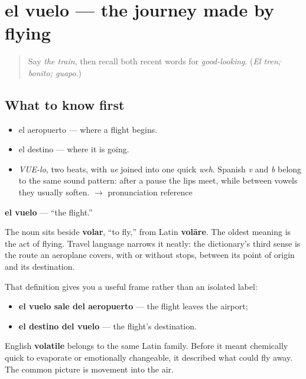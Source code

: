 \section[el vuelo]{el vuelo — the journey made by flying}

\label{lesson:ES-C400-vuelo}



\begin{quote}
Say \emph{the train}, then recall both recent words for \emph{good-looking}. (\emph{El tren; bonito; guapo}.)
\end{quote}

\subsection*{What to know first}
\begin{itemize}
\raggedright
  \item el aeropuerto — where a flight begins.
  \item el destino — where it is going.
\end{itemize}

\begin{sounds}
\begin{itemize}
\raggedright
  \item \emph{VUE-lo}, two beats, with \emph{ue} joined into one quick \emph{weh}. Spanish \emph{v} and \emph{b} belong to the same sound pattern: after a pause the lips meet, while between vowels they usually soften. $\to$ pronunciation reference
\end{itemize}
\end{sounds}

\begin{cousinweb}
\textbf{el vuelo} — \textquotedblleft{}the flight.\textquotedblright{}

The noun sits beside \textbf{volar}, \textquotedblleft{}to fly,\textquotedblright{} from Latin \textbf{volāre}. The oldest meaning is the act of flying. Travel language narrows it neatly: the dictionary's third sense is the route an aeroplane covers, with or without stops, between its point of origin and its destination.

That definition gives you a useful frame rather than an isolated label:

\begin{itemize}
\raggedright
  \item \textbf{el vuelo sale del aeropuerto} — the flight leaves the airport;
  \item \textbf{el destino del vuelo} — the flight's destination.
\end{itemize}

English \textbf{volatile} belongs to the same Latin family. Before it meant chemically quick to evaporate or emotionally changeable, it described what could fly away. The common picture is movement into the air.
\end{cousinweb}

